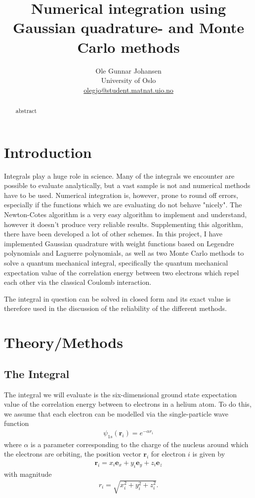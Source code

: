 \documentclass[twoside, 11pt]{article}
\title{\vspace{-15mm}\fontsize{16pt}{13pt}\selectfont\textbf{Numerical integration using Gaussian quadrature- and Monte Carlo methods}} %
\author{
\large
Ole Gunnar Johansen\\[-2mm]%
\normalsize University of Oslo \\[-2mm] %
\normalsize \href{mailto:olegjo@ulrik.uio.no}{olegjo@student.matnat.uio.no} %
\vspace{5mm}
}
\date{}
\begin{document}
\maketitle %
\thispagestyle{fancy} %


\begin{abstract}

\noindent
abstract
\end{abstract}


\section{Introduction}
	Integrals play a huge role in science. Many of the integrals we encounter are possible to evaluate analytically, but a vast sample is not and numerical methods have to be used. Numerical integration is, however, prone to round off errors, especially if the functions which we are evaluating do not behave "nicely". The Newton-Cotes algorithm is a very easy algorithm to implement and understand, however it doesn't produce very reliable results. Supplementing this algorithm, there have been developed a lot of other schemes. In this project, I have implemented Gaussian quadrature with weight functions based on Legendre polynomials and Laguerre polynomials, as well as two Monte Carlo methods to solve a quantum mechanical integral, specifically the quantum mechanical expectation value of the correlation energy between two electrons which repel each other via the classical Coulomb interaction. 
	
	The integral in question can be solved in closed form and its exact value is therefore used in the discussion of the reliability of the different methods.

\section{Theory/Methods}
	\subsection{The Integral}
		The integral we will evaluate is the six-dimensional ground state expectation value of the correlation energy between to electrons in a helium atom. To do this, we assume that each electron can be modelled via the single-particle wave function
		\begin{align}
			\psi_{1s} (\mathbf{r}_i) = e^{-\alpha r_i}
		\end{align}
		where $\alpha$ is a parameter corresponding to the charge of the nucleus around which the electrons are orbiting, the position vector $\mathbf{r}_i$ for electron $i$ is given by
		\begin{align}
			\mathbf{r}_i = x_i \mathbf{e}_x + y_i \mathbf{e}_y + z_i \mathbf{e}_z
		\end{align}
		with magnitude
		\begin{align}
			r_i = \sqrt{x_i^2 + y_i^2 + z_i^2}.
		\end{align}
		
\end{document}
